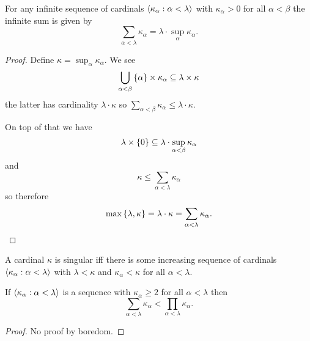 \begin{proposition}
    For any infinite sequence of cardinals
    \(\left<\kappa_{\alpha}:\alpha<\lambda\right>\) with \(\kappa_{\alpha}>0\)
    for all \(\alpha<\beta\) the infinite sum is given by
    \[
        \sum_{\alpha<\lambda}\kappa_{\alpha}=\lambda\cdot\sup_{\alpha}\kappa_{\alpha}.
    \]

    \begin{proof}
        Define \(\kappa=\sup_{\alpha}\kappa_{\alpha}\). We see
        \[
            \bigcup_{\alpha<\beta}\left\{\alpha\right\}\times\kappa_{\alpha}\subseteq\lambda\times\kappa
        \]
        the latter has cardinality \(\lambda\cdot\kappa\) so
        \(\sum_{\alpha<\beta}\kappa_{\alpha}\leq\lambda\cdot\kappa\).

        On top of that we have
        \[
            \lambda\times\left\{0\right\}\subseteq\lambda\cdot\sup_{\alpha<\beta}\kappa_{\alpha}
        \]
        and
        \[
            \kappa\leq\sum_{\alpha<\lambda}\kappa_{\alpha}
        \]
        so therefore
        \[
            \max\left\{\lambda,\kappa\right\}=\lambda\cdot\kappa=\sum_{\alpha<\lambda}\kappa_{\alpha}.
        \]
    \end{proof}
\end{proposition}

\begin{corollary}
    A cardinal \(\kappa\) is singular iff there is some increasing sequence of
    cardinals \(\left<\kappa_{\alpha}:\alpha<\lambda\right>\) with
    \(\lambda<\kappa\) and \(\kappa_{\alpha}<\kappa\) for all
    \(\alpha<\lambda\).
\end{corollary}

\begin{proposition}
    If \(\left<\kappa_{\alpha}:\alpha<\lambda\right>\) is a sequence with
    \(\kappa_{\alpha}\geq 2\) for all \(\alpha<\lambda\) then
    \[
        \sum_{\alpha<\lambda}\kappa_{\alpha}<\prod_{\alpha<\lambda}\kappa_{\alpha}.
    \]

    \begin{proof}
        No proof by boredom.
    \end{proof}
\end{proposition}

